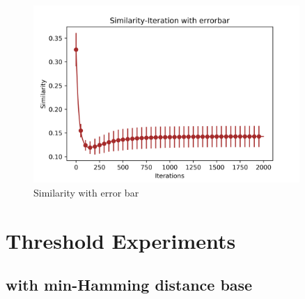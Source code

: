 \documentclass[a4paper,12pt]{article}
\begin{document}
\begin{figure}[H]
	\centering
	\includegraphics[width=0.9\textwidth]{SimErr50_5_2000_100_1}
	\caption{Similarity with error bar}\label{SimErr50_5_2000_100_1s}
\end{figure}
\section{Threshold Experiments}
\graphicspath{{figsThreshold/}}
\subsection{with min-Hamming distance base}
\end{document}
